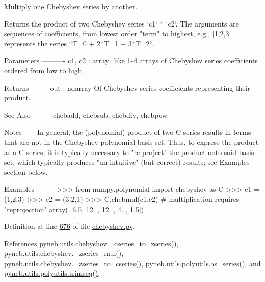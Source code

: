 \begin{DoxyVerb}Multiply one Chebyshev series by another.

Returns the product of two Chebyshev series `c1` * `c2`.  The arguments
are sequences of coefficients, from lowest order "term" to highest,
e.g., [1,2,3] represents the series ``T_0 + 2*T_1 + 3*T_2``.

Parameters
----------
c1, c2 : array_like
    1-d arrays of Chebyshev series coefficients ordered from low to
    high.

Returns
-------
out : ndarray
    Of Chebyshev series coefficients representing their product.

See Also
--------
chebadd, chebsub, chebdiv, chebpow

Notes
-----
In general, the (polynomial) product of two C-series results in terms
that are not in the Chebyshev polynomial basis set.  Thus, to express
the product as a C-series, it is typically necessary to "re-project"
the product onto said basis set, which typically produces
"un-intuitive" (but correct) results; see Examples section below.

Examples
--------
>>> from numpy.polynomial import chebyshev as C
>>> c1 = (1,2,3)
>>> c2 = (3,2,1)
>>> C.chebmul(c1,c2) # multiplication requires "reprojection"
array([  6.5,  12. ,  12. ,   4. ,   1.5])\end{DoxyVerb}
 

Definition at line \hyperlink{chebyshev_8py_source_l00676}{676} of file \hyperlink{chebyshev_8py_source}{chebyshev.\-py}.



References \hyperlink{chebyshev_8py_source_l00100}{pyneb.\-utils.\-chebyshev.\-\_\-cseries\-\_\-to\-\_\-zseries()}, \hyperlink{chebyshev_8py_source_l00148}{pyneb.\-utils.\-chebyshev.\-\_\-zseries\-\_\-mul()}, \hyperlink{chebyshev_8py_source_l00124}{pyneb.\-utils.\-chebyshev.\-\_\-zseries\-\_\-to\-\_\-cseries()}, \hyperlink{polyutils_8py_source_l00115}{pyneb.\-utils.\-polyutils.\-as\-\_\-series()}, and \hyperlink{polyutils_8py_source_l00085}{pyneb.\-utils.\-polyutils.\-trimseq()}.


